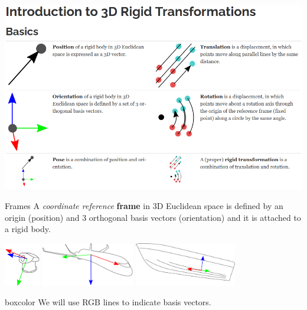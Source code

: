 \documentclass[14pt]{beamer}
\begin{document}
\begin{frame}
\includegraphics[width=\textwidth]{images/introduction}
\end{frame}

\begin{frame}{Frames}
A \textit{coordinate reference} \textbf{frame} in 3D Euclidean space is defined by an origin (position) and 3 orthogonal basis vectors (orientation) and it is attached to a rigid body.

\vfill

\includegraphics[height=1.9cm]{images/conventions_camera}
\includegraphics[height=1.9cm]{images/conventions_plane}
\includegraphics[height=1.9cm]{images/conventions_ship}

\vfill

\begin{beamercolorbox}[wd=\textwidth,sep=1em]{boxcolor}
We will use RGB lines to indicate basis vectors.
\end{beamercolorbox}
\end{frame}
\end{document}

